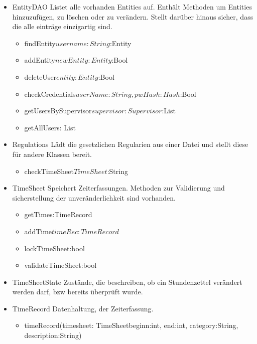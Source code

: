 \begin{itemize}
            \item{EntityDAO}
                Listet alle vorhanden Entities auf. Enthält Methoden um Entities hinzuzufügen, zu löschen oder zu verändern. Stellt darüber hinaus sicher, dass die alle einträge einzigartig sind.
                \begin{itemize}
                   \item{findEntity\(username:String\):Entity}
                   \item{addEntity\(newEntity:Entity\):Bool}
                   \item{deleteUser\(entity:Entity\):Bool}
                   \item{checkCredentials\(userName:String, pwHash:Hash\):Bool}
                   \item{getUsersBySupervisor\(supervisor:Supervisor\):List}
                   \item{getAllUsers\(\): List}
                \end{itemize}

            \item{Regulations}
                Lädt die gesetzlichen Regularien aus einer Datei und stellt diese für andere Klassen bereit.
                \begin{itemize}
                    \item{checkTimeSheet\(TimeSheet\):String}
                \end{itemize}

            \item{TimeSheet}
                Speichert Zeiterfassungen. Methoden zur Validierung und sicherstellung der unveränderlichkeit sind vorhanden.
                \begin{itemize}
                    \item{getTimes\(\):TimeRecord\[\]}
                    \item{addTime\(timeRec:TimeRecord\)}
                    \item{lockTimeSheet\(\):bool}
                    \item{validateTimeSheet\(\):bool}
                \end{itemize}

            \item{TimeSheetState}
                Zustände, die beschreiben, ob ein Stundenzettel verändert werden darf, bzw bereits überprüft wurde.

            \item{TimeRecord}
                Datenhaltung, der Zeiterfassung.
                \begin{itemize}
                   \item{timeRecord(timesheet: TimeSheetbeginn:int, end:int, category:String, description:String)}
                \end{itemize}


\end{itemize}

